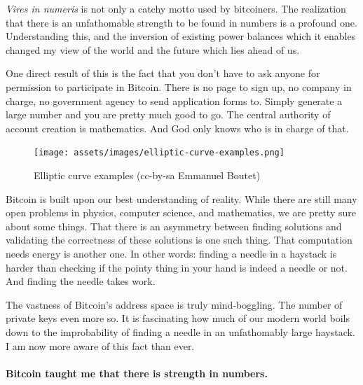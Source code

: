 \textit{Vires in numeris} is not only a catchy motto used by bitcoiners. The
realization that there is an unfathomable strength to be found in
numbers is a profound one. Understanding this, and the inversion of
existing power balances which it enables changed my view of the world
and the future which lies ahead of us.

One direct result of this is the fact that you don't have to ask anyone
for permission to participate in Bitcoin. There is no page to sign up,
no company in charge, no government agency to send application forms to.
Simply generate a large number and you are pretty much good to go. The
central authority of account creation is mathematics. And God only knows
who is in charge of that.

\begin{figure}
  \texttt{[image: assets/images/elliptic-curve-examples.png]}
  \caption{Elliptic curve examples (cc-by-sa Emmanuel Boutet)}
  \label{fig:elliptic-curve-examples}
\end{figure}

Bitcoin is built upon our best understanding of reality. While there are
still many open problems in physics, computer science, and mathematics,
we are pretty sure about some things. That there is an asymmetry between
finding solutions and validating the correctness of these solutions is
one such thing. That computation needs energy is another one. In other
words: finding a needle in a haystack is harder than checking if the
pointy thing in your hand is indeed a needle or not. And finding the
needle takes work.

The vastness of Bitcoin's address space is truly mind-boggling. The
number of private keys even more so. It is fascinating how much of our
modern world boils down to the improbability of finding a needle in an
unfathomably large haystack. I am now more aware of this fact than ever.

\paragraph{Bitcoin taught me that there is strength in numbers.}

